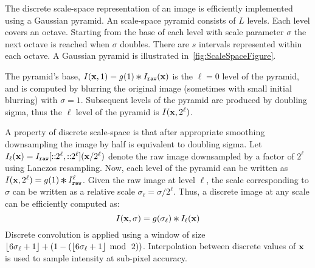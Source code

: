 
            The discrete scale-space representation of an image is
              efficiently implemented using a Gaussian pyramid.
            An scale-space pyramid consists of $L$ levels.
            Each level covers an octave.
            Starting from the base of each level with scale parameter
              $\sigma$ the next octave is reached when $\sigma$ doubles.
            There are $s$ intervals represented within each octave.
            A Gaussian pyramid is illustrated
              in~\cref{fig:ScaleSpaceFigure}.

            \ScaleSpaceFigure{}

            The pyramid's base, %
            $\img(\pt, 1) = g( 1 ) \conv \rawimg(\pt)$ %
            is the $\ell=0$\th{} level of the pyramid, and is computed by blurring
              the original image (sometimes with small initial blurring) with
              $\sigma=1$.
            Subsequent levels of the pyramid are produced by doubling sigma,
              thus the $\ell$\th{} level of the pyramid is $I(\mathbf{x}, 2^\ell)$.

            A property of discrete scale-space is that after
              appropriate smoothing downsampling the image by half is
              equivalent to doubling sigma.
            Let
            $I_\ell(\mathbf{x}) = I_{\tt{raw}}[::\mkern-6mu2^{\ell},::\mkern-6mu2^{\ell}]({\mathbf{x}} / {2^{\ell}})$ 
            denote the raw image downsampled by a factor of $2^{\ell}$
              using Lanczos resampling.
            Now, each level of the pyramid can be written as %
            $\img(\pt, 2^\ell) = g( 1 ) \conv \rawimg^\ell$.
            Given the raw image at level $\ell$, the scale
              corresponding to $\sigma$ can be written as a relative
              scale
            $\sigma_\ell = \sigma / 2^\ell$.
            Thus, a discrete image at any scale can be efficiently computed
              as:
            \begin{equation}
                \img(\pt, \sigma) =
                    g(\sigma_\ell) \conv \img_\ell(\pt)
            \end{equation}
            Discrete convolution is applied using a window of size
              $\left\lfloor{} 6\sigma_\ell + 1 \right\rfloor + (1 -
              (\left\lfloor{} 6\sigma_\ell + 1 \right\rfloor\; \operatorname{mod}{} \;\,2))$.
            Interpolation between discrete values of $\mathbf{x}$ is used to
              sample intensity at sub-pixel accuracy.

